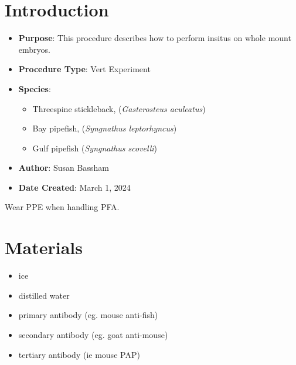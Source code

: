 \documentclass[
  letterpaper,
  DIV=11,
  numbers=noendperiod]{scrreprt}
\providecommand{\tightlist}{%
  \setlength{\itemsep}{0pt}\setlength{\parskip}{0pt}}\usepackage{longtable,booktabs,array}
\begin{document}
\hypertarget{introduction-71}{%
\section{Introduction}\label{introduction-71}}

\begin{itemize}
\tightlist
\item
  \textbf{Purpose}: This procedure describes how to perform insitus on
  whole mount embryos.
\item
  \textbf{Procedure Type}: Vert Experiment
\item
  \textbf{Species}:

  \begin{itemize}
  \tightlist
  \item
    Threespine stickleback, (\emph{Gasterosteus aculeatus})
  \item
    Bay pipefish, (\emph{Syngnathus leptorhyncus})
  \item
    Gulf pipefish (\emph{Syngnathus scovelli})
  \end{itemize}
\item
  \textbf{Author}: Susan Bassham
\item
  \textbf{Date Created}: March 1, 2024
\end{itemize}

\begin{tcolorbox}[enhanced jigsaw, rightrule=.15mm, title=\textcolor{quarto-callout-warning-color}{\faExclamationTriangle}\hspace{0.5em}{Chemical Warning}, titlerule=0mm, opacitybacktitle=0.6, toprule=.15mm, bottomrule=.15mm, opacityback=0, left=2mm, colframe=quarto-callout-warning-color-frame, breakable, coltitle=black, colback=white, colbacktitle=quarto-callout-warning-color!10!white, bottomtitle=1mm, leftrule=.75mm, toptitle=1mm, arc=.35mm]

Wear PPE when handling PFA.

\end{tcolorbox}

\hypertarget{materials-67}{%
\section{Materials}\label{materials-67}}

\begin{itemize}
\tightlist
\item
  ice
\item
  distilled water
\item
  primary antibody (eg. mouse anti-fish)
\item
  secondary antibody (eg. goat anti-mouse)
\item
  tertiary antibody (ie mouse PAP)
\end{itemize}
\end{document}
